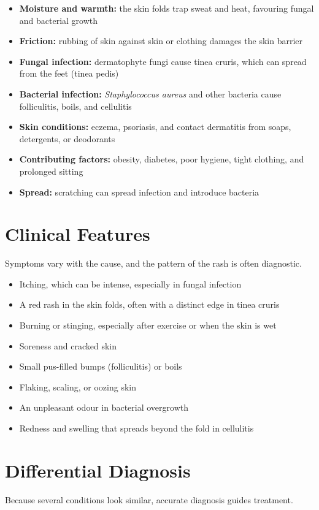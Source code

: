 \begin{itemize}
    \item \textbf{Moisture and warmth:} the skin folds trap sweat and heat, favouring fungal and bacterial growth
    \item \textbf{Friction:} rubbing of skin against skin or clothing damages the skin barrier
    \item \textbf{Fungal infection:} dermatophyte fungi cause tinea cruris, which can spread from the feet (tinea pedis)
    \item \textbf{Bacterial infection:} \textit{Staphylococcus aureus} and other bacteria cause folliculitis, boils, and cellulitis
    \item \textbf{Skin conditions:} eczema, psoriasis, and contact dermatitis from soaps, detergents, or deodorants
    \item \textbf{Contributing factors:} obesity, diabetes, poor hygiene, tight clothing, and prolonged sitting
    \item \textbf{Spread:} scratching can spread infection and introduce bacteria
\end{itemize}

\section*{Clinical Features}
Symptoms vary with the cause, and the pattern of the rash is often diagnostic.

\begin{itemize}
    \item Itching, which can be intense, especially in fungal infection
    \item A red rash in the skin folds, often with a distinct edge in tinea cruris
    \item Burning or stinging, especially after exercise or when the skin is wet
    \item Soreness and cracked skin
    \item Small pus-filled bumps (folliculitis) or boils
    \item Flaking, scaling, or oozing skin
    \item An unpleasant odour in bacterial overgrowth
    \item Redness and swelling that spreads beyond the fold in cellulitis
\end{itemize}

\section*{Differential Diagnosis}
Because several conditions look similar, accurate diagnosis guides treatment.

